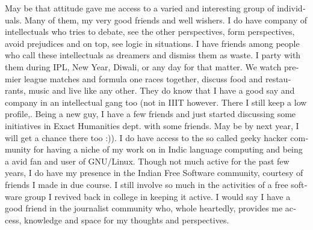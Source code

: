 \begin{english}
May be that attitude gave me access to a varied and interesting group of individuals. Many of them, 
my very good friends and well wishers. I do have company of intellectuals who tries to debate, see 
the other perspectives, form perspectives, avoid prejudices and on top, see logic in situations. I 
have friends among people who call these intellectuals as dreamers and dismiss them as waste. I party 
with them during IPL, New Year, Diwali, or any day for that matter. We watch premier league matches 
and formula one races together, discuss food and restaurants, music and live like any other. They do 
know that I have a good say and company in an intellectual gang too (not in IIIT however. There I still keep a low
profile,. Being a new guy, I have a few friends and just started discussing some initiatives in Exact
Humanities dept. with some friends. May be by next year, I will get a chance there too :)). I do 
have access to the so called geeky hacker community for having a niche of my work on in Indic 
language computing and being a avid fan and user of GNU/Linux. Though not much active for the past 
few years, I do have my presence in the Indian Free Software community, courtesy of friends I made in 
due course. I still involve so much in the activities of a free software group I revived back in 
college in keeping it active. I would say I have a good friend in the journalist community who, whole
heartedly, provides me access, knowledge and space for my thoughts and perspectives.  



\end{english}
